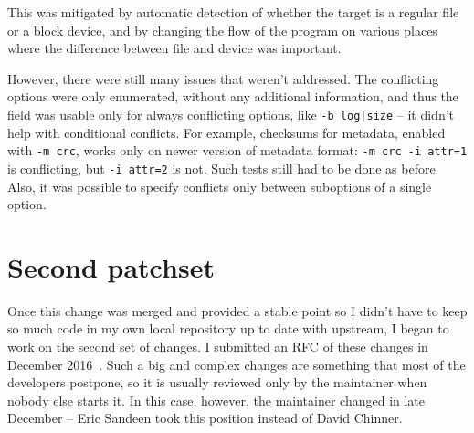 This was mitigated by automatic detection of whether the target is a
regular file or a block device, and by changing the flow of the program on
various places where the difference between file and device was important.

However, there were still many issues that weren't addressed. The
conflicting options were only enumerated, without any additional
information, and thus the field was usable only for always conflicting
options, like {\tt -b log|size} -- it didn't help with conditional conflicts.
For example, checksums for metadata, enabled with {\tt -m crc}, works only
on newer version of metadata format: {\tt -m crc -i attr=1} is conflicting,
but {\tt -i attr=2} is not. Such tests still had to be done as before.
Also, it was possible to specify conflicts only between suboptions of a
single option.


\section{Second patchset}\label{chap:refactoring:second}

Once this change was merged and provided a stable point so I didn't have to
keep so much code in my own local repository up to date with upstream, I
began to work on the second set of changes. I submitted an
RFC of these
changes in December 2016~\cite{secondSetRFC}. Such a big and complex
changes are something that most of the developers postpone, so it is
usually reviewed only by the maintainer when nobody else starts it. In this
case, however, the maintainer changed in late December -- Eric Sandeen took
this position instead of David Chinner.

